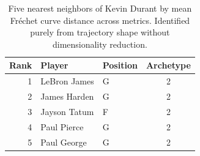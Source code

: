 \begin{table}[htbp]
  \centering\small
  \begin{tabular}{rllc}
    \toprule
    Rank & Player & Position & Archetype \\
    \midrule
    1 & LeBron James & G & 2 \\
    2 & James Harden & G & 2 \\
    3 & Jayson Tatum & F & 2 \\
    4 & Paul Pierce & G & 2 \\
    5 & Paul George & G & 2 \\
    \bottomrule
  \end{tabular}
  \caption{Five nearest neighbors of Kevin Durant by mean Fr\'{e}chet curve distance across metrics. Identified purely from trajectory shape without dimensionality reduction.}
  \label{tab:Kevin_Durant_frechet_curve_neighbors}
\end{table}

